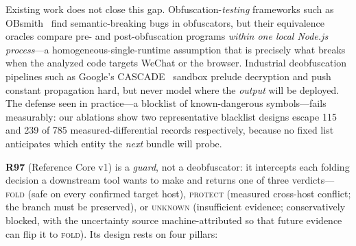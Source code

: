 \documentclass[sigconf,nonacm]{acmart}
\begin{document}
Existing work does not close this gap. Obfuscation-\emph{testing} frameworks such as OBsmith~\cite{obsmith} find semantic-breaking bugs in obfuscators, but their equivalence oracles compare pre- and post-obfuscation programs \emph{within one local Node.js process}---a homogeneous-single-runtime assumption that is precisely what breaks when the analyzed code targets WeChat or the browser. Industrial deobfuscation pipelines such as Google's CASCADE~\cite{cascade} sandbox prelude decryption and push constant propagation hard, but never model where the \emph{output} will be deployed. The defense seen in practice---a blocklist of known-dangerous symbols---fails measurably: our ablations show two representative blacklist designs escape 115 and 239 of 785 measured-differential records respectively, because no fixed list anticipates which entity the \emph{next} bundle will probe.

\textbf{R97} (Reference Core v1) is a \emph{guard}, not a deobfuscator: it intercepts each folding decision a downstream tool wants to make and returns one of three verdicts---\textsc{fold} (safe on every confirmed target host), \textsc{protect} (measured cross-host conflict; the branch must be preserved), or \textsc{unknown} (insufficient evidence; conservatively blocked, with the uncertainty source machine-attributed so that future evidence can flip it to \textsc{fold}). Its design rests on four pillars:
\end{document}
